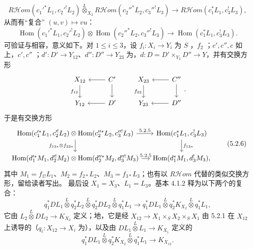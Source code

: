 \[R\mathcal Hom(c_1'^*L_1,c_2'^!L_2)\mathbin{\overset L\otimes}_{X_2}R\mathcal Hom(c_2''^*L_2,c_3''^!L_3)\longrightarrow R\mathcal Hom(c_1^*L_1,c_3^!L_3),\tag{5.2.4}\]
从而有“复合” $(u,v)\mapsto vu$：
\[\operatorname{Hom}(c_1'^*L_1,c_2'^!L_2)\otimes\operatorname{Hom}(c_2''^*L_2,c_3''^!L_3)\longrightarrow\operatorname{Hom}(c_1^*L_1,c_3^!L_3).\tag{5.2.5}\]
可验证与相容，意义如下。对 $1\leq i\leq3$，设 $f_i:X_i\to Y_i$ 为 $S$ ，$f_2$ ；$c',c'',c$ 如上，$c',c''$ ；$d':D'\to Y_{12}$、$d'':D''\to Y_{23}$ 为，$d:D=D'\times_{Y_2}D''\to Y$，并有交换方形
\[\begin{tikzcd}X_{12}\arrow[d,"f_{12}"']&C'\arrow[l]\arrow[d]\\Y_{12}&D'\arrow[l]\end{tikzcd}\qquad\begin{tikzcd}X_{23}\arrow[d,"f_{23}"']&C''\arrow[l]\arrow[d]\\Y_{23}&D''\arrow[l]\end{tikzcd}.\]
于是有交换方形
\[\begin{tikzcd}[column sep=small]
\operatorname{Hom}(c_1'^*L_1,c_2'^!L_2)\otimes\operatorname{Hom}(c_2''^*L_2,c_3''^!L_3)\arrow[r,"5.2.5"]\arrow[d,"{f_{12*}\otimes f_{23*}}"']&\operatorname{Hom}(c_1^*L_1,c_3^!L_3)\arrow[d,"f_{13*}"]\\
\operatorname{Hom}(d_1'^*M_1,d_2'^!M_2)\otimes\operatorname{Hom}(d_2''^*M_2,d_3''^!M_3)\arrow[r,"5.2.5"]&\operatorname{Hom}(d_1^*M_1,d_3^!M_3),
\end{tikzcd}\tag{5.2.6}\]
其中 $M_1=f_{1!}L_1$、$M_2=f_{2*}L_2$、$M_3=f_{3*}L_3$；也有以 $R\mathcal Hom$ 代替的类似交换方形，留给读者写出。
最后设 $X_1=X_3$、$L_1=L_3$。基本 4.1.2 释为以下两个的复合：
\[q_1^*DL_1\mathbin{\overset L\otimes}q_2^*L_2\mathbin{\overset L\otimes}q_2^*DL_2\mathbin{\overset L\otimes}q_1^*L_1\longrightarrow q_1^*DL_1\mathbin{\overset L\otimes}q_2^*K_{X_2}\mathbin{\overset L\otimes}q_1^*L_1,\tag{5.2.7}\]
它由 $L_2\mathbin{\overset L\otimes}DL_2\to K_{X_2}$ 定义；地，它是经 $X_{12}\to X_1\times_SX_2\times_SX_1$ 由 5.2.1 在 $X_{12}$ 上诱导的（$q_i:X_{12}\to X_i$ 为），以及由 $DL_1\mathbin{\overset L\otimes}L_1\to K_{X_1}$ 定义的
\[q_1^*DL_1\mathbin{\overset L\otimes}q_2^*K_{X_2}\mathbin{\overset L\otimes}q_1^*L_1\longrightarrow K_{X_{12}}.\tag{5.2.8}\]
